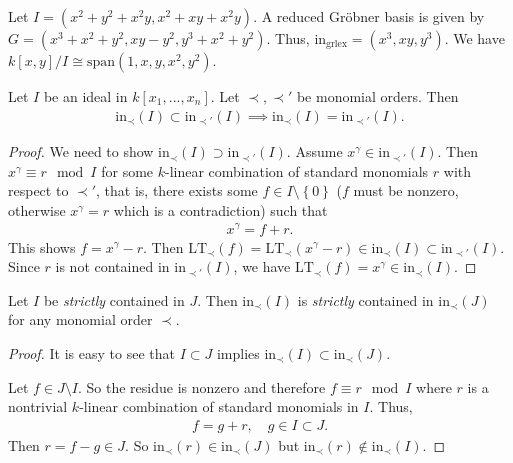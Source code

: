 \documentclass[a4paper, 11pt]{article}
\begin{document}
\begin{eg}
  Let \( I = (x^2 + y^2 + x^2y, x^2 + xy + x^2y) \). A reduced Gröbner basis is given by \( G = (x^3 + x^2 + y^2, xy - y^2, y^3 + x^2 + y^2) \). Thus, \( \mathrm{in}_{\mathrm{grlex}} = (x^3 , xy, y^3) \). We have \( k[x,y] / I \cong \mathrm{span}(1,x,y,x^2,y^2) \).
\end{eg}

\begin{cor}\label{macaulay-cor}
  Let \( I \) be an ideal in \( k[x_1,...,x_n] \). Let \( \prec, \prec' \) be monomial orders. Then 
  \begin{align*}
    \mathrm{in}_\prec(I) \subset \mathrm{in}_{\prec '} (I) \implies \mathrm{in}_\prec(I) = \mathrm{in}_{\prec '} (I).
  \end{align*}
\end{cor}

\begin{proof}
  We need to show \( \mathrm{in}_\prec(I) \supset \mathrm{in}_{\prec '} (I)\). Assume \( x^\gamma \in \mathrm{in}_{\prec '}(I) \). Then \( x^\gamma \equiv r \mod I \) for some \( k \)-linear combination of standard monomials \( r \) with respect to \( \prec ' \), that is, there exists some \( f \in I \setminus \left\{ 0 \right\} \)  (\( f \) must be nonzero, otherwise \( x^\gamma = r \) which is a contradiction) such that
  \begin{align*}
    x^\gamma = f + r.
  \end{align*}
  This shows \( f = x^\gamma - r \). Then \( \mathrm{LT}_{\prec} (f) = \mathrm{LT}_\prec(x^\gamma -r) \in \mathrm{in}_{\prec}(I) \subset \mathrm{in}_{\prec '}(I) \). Since \( r \) is not contained in \( \mathrm{in}_{\prec '} (I) \), we have \( \mathrm{LT}_\prec (f) = x^\gamma \in \mathrm{in}_\prec(I)\).
\end{proof}

\begin{cor}\label{macaulay-cor-2}
  Let \( I \) be \emph{strictly} contained in \( J \). Then \( \mathrm{in}_\prec (I) \) is \emph{strictly} contained in \( \mathrm{in}_\prec(J) \) for any monomial order \( \prec \).
\end{cor}

\begin{proof}
  It is easy to see that \( I \subset J \) implies \( \mathrm{in}_\prec(I) \subset \mathrm{in}_\prec(J) \).

  Let \( f \in J \setminus I \). So the residue is nonzero and therefore \( f \equiv r \mod I \) where \( r \) is a nontrivial \( k \)-linear combination of standard monomials in \( I \). Thus, 
  \begin{align*}
    f = g + r, \quad g \in I \subset J.
  \end{align*}
  Then \( r = f -g \in J \). So \( \mathrm{in}_\prec(r) \in \mathrm{in}_\prec(J)  \) but \( \mathrm{in}_\prec(r) \notin \mathrm{in}_\prec(I) \).
\end{proof}
\end{document}
